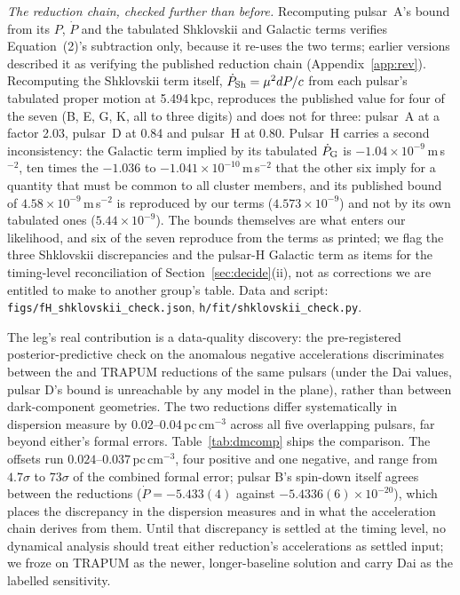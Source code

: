 \documentclass[11pt]{article}
\begin{document}
\emph{The reduction chain, checked further than before.} Recomputing pulsar~A's bound from its $P$, $\dot{P}$ and the tabulated Shklovskii and Galactic terms verifies Equation~(2)'s subtraction only, because it re-uses the two terms; earlier versions described it as verifying the published reduction chain (Appendix~\ref{app:rev}). Recomputing the Shklovskii term itself, $\dot{P}_{\rm Sh} = \mu^{2}dP/c$ from each pulsar's tabulated proper motion at 5.494\,kpc, reproduces the published value for four of the seven (B, E, G, K, all to three digits) and does not for three: pulsar~A at a factor 2.03, pulsar~D at 0.84 and pulsar~H at 0.80. Pulsar~H carries a second inconsistency: the Galactic term implied by its tabulated $\dot{P}_{\rm G}$ is $-1.04\times10^{-9}$\,m\,s$^{-2}$, ten times the $-1.036$ to $-1.041\times10^{-10}$\,m\,s$^{-2}$ that the other six imply for a quantity that must be common to all cluster members, and its published bound of $4.58\times10^{-9}$\,m\,s$^{-2}$ is reproduced by our terms ($4.573\times10^{-9}$) and not by its own tabulated ones ($5.44\times10^{-9}$). The bounds themselves are what enters our likelihood, and six of the seven reproduce from the terms as printed; we flag the three Shklovskii discrepancies and the pulsar-H Galactic term as items for the timing-level reconciliation of Section~\ref{sec:decide}(ii), not as corrections we are entitled to make to another group's table. Data and script: \texttt{figs/fH\_shklovskii\_check.json}, \texttt{h/fit/shklovskii\_check.py}.

The leg's real contribution is a data-quality discovery: the pre-registered posterior-predictive check on the anomalous negative accelerations discriminates between the \citet{Dai2023} and TRAPUM reductions of the same pulsars (under the Dai values, pulsar D's bound is unreachable by any model in the plane), rather than between dark-component geometries. The two reductions differ systematically in dispersion measure by 0.02--0.04\,pc\,cm$^{-3}$ across all five overlapping pulsars, far beyond either's formal errors. Table~\ref{tab:dmcomp} ships the comparison. The offsets run $0.024$--$0.037$\,pc\,cm$^{-3}$, four positive and one negative, and range from $4.7\sigma$ to $73\sigma$ of the combined formal error; pulsar B's spin-down itself agrees between the reductions ($\dot{P} = -5.433(4)$ against $-5.4336(6)\times10^{-20}$), which places the discrepancy in the dispersion measures and in what the acceleration chain derives from them. Until that discrepancy is settled at the timing level, no dynamical analysis should treat either reduction's accelerations as settled input; we froze on TRAPUM as the newer, longer-baseline solution and carry Dai as the labelled sensitivity.
\end{document}
